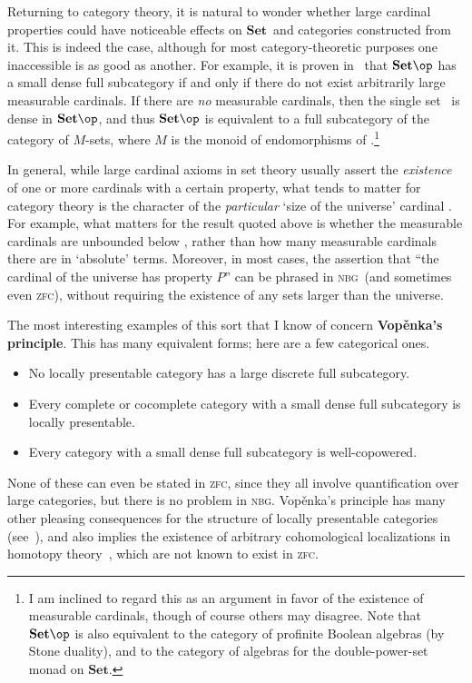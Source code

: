 \documentclass{amsart}
\newcommand{\Set}{\ensuremath{\mathbf{Set}}}
\def\zfc{\textsc{zfc}}
\def\nbg{\textsc{nbg}}
\begin{document}
Returning to category theory, it is natural to wonder whether large
cardinal properties could have noticeable effects on \Set\ and
categories constructed from it.  This is indeed the case, although for
most category-theoretic purposes one inaccessible is as good as
another.  For example, it is proven in~\cite[A.5]{ar:loc-pres} that
$\Set\op$ has a small dense full subcategory if and only if there do
not exist arbitrarily large measurable cardinals.  If there are
\emph{no} measurable cardinals, then the single set \bbN\ is dense in
$\Set\op$, and thus $\Set\op$ is equivalent to a full subcategory of
the category of $M$-sets, where $M$ is the monoid of endomorphisms of
\bbN.\footnote{I am inclined to regard this as an argument in favor of
  the existence of measurable cardinals, though of course others may
  disagree.  Note that $\Set\op$ is also equivalent to the category of
  profinite Boolean algebras (by Stone duality), and to the category
  of algebras for the double-power-set monad on \Set.}

In general, while large cardinal axioms in set theory usually assert
the \emph{existence} of one or more cardinals with a certain property,
what tends to matter for category theory is the character of the
\emph{particular} `size of the universe' cardinal \ka.  For example,
what matters for the result quoted above is whether the measurable
cardinals are unbounded below \ka, rather than how many measurable
cardinals there are in `absolute' terms.  Moreover, in most cases, the
assertion that ``the cardinal of the universe has property $P$'' can
be phrased in \nbg\ (and sometimes even \zfc), without requiring the
existence of any sets larger than the universe.

The most interesting examples of this sort that I know of concern
\textbf{Vop\v{e}nka's principle}.  This has many equivalent forms;
here are a few categorical ones.
\begin{itemize}
\item No locally presentable category has a large discrete full
  subcategory.
\item Every complete or cocomplete category with a small dense full
  subcategory is locally presentable.
\item Every category with a small dense full subcategory is
  well-copowered.
\end{itemize}
None of these can even be stated in \zfc, since they all involve
quantification over large categories, but there is no problem in \nbg.
{Vop\v{e}nka's principle} has many other pleasing consequences for the
structure of locally presentable categories
(see~\cite[Ch.~6]{ar:loc-pres}), and also implies the existence of
arbitrary cohomological localizations in homotopy
theory~\cite{css:large-cardinal}, which are not known to exist in \zfc.
\end{document}

